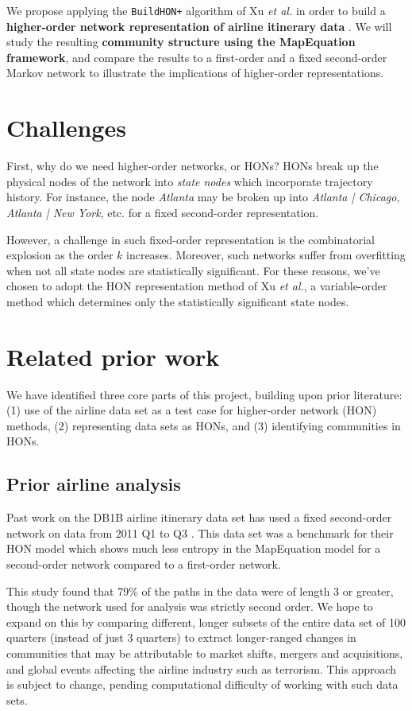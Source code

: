 \documentclass[sigconf]{acmart}
\begin{document}
We propose applying the \texttt{BuildHON+} algorithm of Xu \textit{et al.} in order to build a \textbf{higher-order network representation of airline itinerary data} \cite{Xu2017, AirlineData}. We will study the resulting \textbf{community structure using the MapEquation framework}, and compare the results to a first-order and a fixed second-order Markov network to illustrate the implications of higher-order representations. 

\section{Challenges}
First, why do we need higher-order networks, or HONs?
HONs break up the physical nodes of the network into \textit{state nodes} which incorporate trajectory history.
For instance, the node \textit{Atlanta} may be broken up into \textit{Atlanta | Chicago}, \textit{Atlanta | New York}, etc. for a fixed second-order representation.

However, a challenge in such fixed-order representation is the combinatorial explosion as the order $k$ increases. Moreover, such networks suffer from overfitting when not all state nodes are statistically significant. For these reasons, we've chosen to adopt the HON representation method of Xu \textit{et al.}, a variable-order method which determines only the statistically significant state nodes. 

\section{Related prior work}
We have identified three core parts of this project, building upon prior literature: (1) use of the airline data set as a test case for higher-order network (HON) methods, (2) representing data sets as HONs, and (3) identifying communities in HONs.


\subsection{Prior airline analysis}

Past work on the DB1B airline itinerary data set has used a fixed second-order network on data from 2011 Q1 to Q3 \cite{Rosvall2014}. This data set was a benchmark for their HON model which shows much less entropy in the MapEquation model for a second-order network compared to a first-order network.

This study found that 79\% of the paths in the data were of length 3 or greater, though the network used for analysis was strictly second order. We hope to expand on this by comparing different, longer subsets of the entire data set of 100 quarters (instead of just 3 quarters) to extract longer-ranged changes in communities that may be attributable to market shifts, mergers and acquisitions, and global events affecting the airline industry such as terrorism. This approach is subject to change, pending computational difficulty of working with such data sets.
\end{document}
